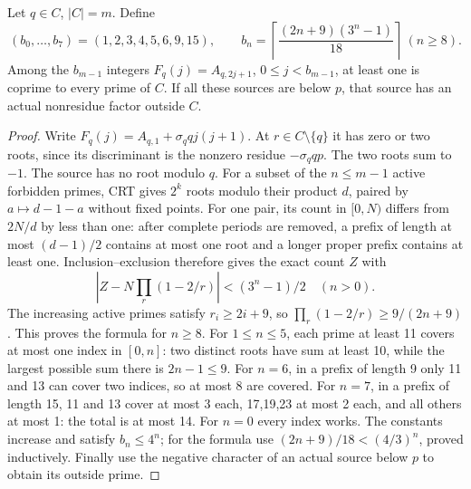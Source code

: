 \documentclass[11pt,reqno]{amsart}
\begin{document}
\begin{lemma}\label{prefix}
Let $q\in C$, $|C|=m$. Define
\[
 (b_0,\ldots,b_7)=(1,2,3,4,5,6,9,15),\qquad
 b_n=\left\lceil\frac{(2n+9)(3^n-1)}{18}\right\rceil\ (n\ge8).
\]
Among the $b_{m-1}$ integers $F_q(j)=A_{q,2j+1}$, $0\le j<b_{m-1}$,
at least one is coprime to every prime of $C$. If all these sources are below $p$,
that source has an actual nonresidue factor outside $C$.
\end{lemma}
\begin{proof}
Write $F_q(j)=A_{q,1}+\sigma_q qj(j+1)$. At $r\in C\setminus\{q\}$ it has
zero or two roots, since its discriminant is the nonzero residue $-\sigma_q qp$.
The two roots sum to $-1$. The source has no root modulo $q$.
For a subset of the $n\le m-1$ active forbidden primes, CRT gives $2^k$ roots
modulo their product $d$, paired by $a\mapsto d-1-a$ without fixed points.
For one pair, its count in $[0,N)$ differs from $2N/d$ by less than one: after
complete periods are removed, a prefix of length at most $(d-1)/2$ contains at
most one root and a longer proper prefix contains at least one. Inclusion--exclusion
therefore gives the exact count $Z$ with
\[
 \left|Z-N\prod_r(1-2/r)\right|<(3^n-1)/2\quad(n>0).       \tag{1}
\]
The increasing active primes satisfy $r_i\ge2i+9$, so
$\prod_r(1-2/r)\ge9/(2n+9)$. This proves the formula for $n\ge8$.
For $1\le n\le5$, each prime at least 11 covers at most one index in $[0,n]$:
two distinct roots have sum at least 10, while the largest possible sum there is
$2n-1\le9$. For $n=6$, in a prefix of length 9 only 11 and 13 can cover two indices,
so at most 8 are covered. For $n=7$, in a prefix of length 15, 11 and 13 cover at
most 3 each, 17,19,23 at most 2 each, and all others at most 1: the total is at most 14.
For $n=0$ every index works. The constants increase and satisfy $b_n\le4^n$;
for the formula use $(2n+9)/18<(4/3)^n$, proved inductively. Finally use the
negative character of an actual source below $p$ to obtain its outside prime.
\end{proof}
\end{document}
